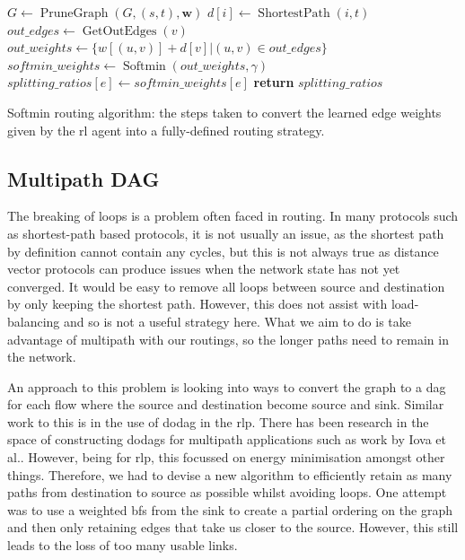 \begin{algorithm}[t]
\small
\begin{algorithmic}
    \State $G \gets \operatorname{PruneGraph}(G, (s, t), \bm{w})$
      \State $d[i] \gets \operatorname{ShortestPath}(i, t)$
    \EndFor
      \State $out\_edges \gets \operatorname{GetOutEdges}(v)$
      \State $out\_weights \gets \{w[(u, v)] + d[v] | (u, v) \in out\_edges\}$
      \State{}
      \State $softmin\_weights \gets \operatorname{Softmin}(out\_weights, \gamma)$
        \State $splitting\_ratios[e] \gets softmin\_weights[e]$
      \EndFor
    \EndFor
  \EndFor
  \State \textbf{return} $splitting\_ratios$
\EndFunction
\end{algorithmic}
\caption{Softmin routing algorithm: the steps taken to convert the learned edge weights given by the \ac{rl} agent into a fully-defined routing strategy.}
\label{algorithm:softmin}
\end{algorithm}

\subsection{Multipath DAG}
The breaking of loops is a problem often faced in routing. In many protocols such as shortest-path based protocols, it is not usually an issue, as the shortest path by definition cannot contain any cycles, but this is not always true as distance vector protocols can produce issues when the network state has not yet converged. It would be easy to remove all loops between source and destination by only keeping the shortest path. However, this does not assist with load-balancing and so is not a useful strategy here. What we aim to do is take advantage of multipath with our routings, so the longer paths need to remain in the network.

An approach to this problem is looking into ways to convert the graph to a \ac{dag} for each flow where the source and destination become source and sink. Similar work to this is in the use of \ac{dodag} in the \ac{rlp}\cite{rfc6550}. There has been research in the space of constructing \acp{dodag} for multipath applications such as work by Iova et al.\cite{iova2015using}. However, being for \ac{rlp}, this focussed on energy minimisation amongst other things.
Therefore, we had to devise a new algorithm to efficiently retain as many paths from destination to source as possible whilst avoiding loops. One attempt was to use a weighted \ac{bfs} from the sink to create a partial ordering on the graph and then only retaining edges that take us closer to the source. However, this still leads to the loss of too many usable links.

